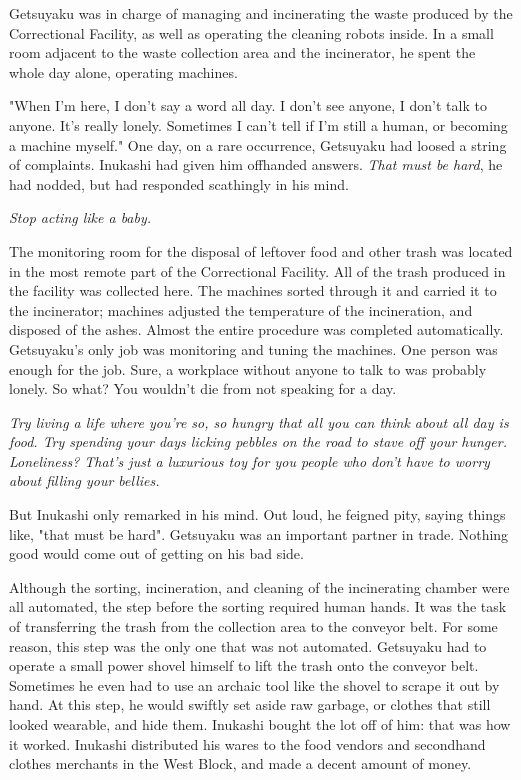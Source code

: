 Getsuyaku was in charge of managing and incinerating the waste produced
by the Correctional Facility, as well as operating the cleaning robots
inside. In a small room adjacent to the waste collection area and the
incinerator, he spent the whole day alone, operating machines.

"When I'm here, I don't say a word all day. I don't see anyone, I don't
talk to anyone. It's really lonely. Sometimes I can't tell if I'm still
a human, or becoming a machine myself." One day, on a rare occurrence,
Getsuyaku had loosed a string of complaints. Inukashi had given him
offhanded answers. \emph{That must be hard}, he had nodded, but had responded
scathingly in his mind.

\emph{Stop acting like a baby.}

The monitoring room for the disposal of leftover food and other trash
was located in the most remote part of the Correctional Facility. All of
the trash produced in the facility was collected here. The machines
sorted through it and carried it to the incinerator; machines adjusted
the temperature of the incineration, and disposed of the ashes. Almost
the entire procedure was completed automatically. Getsuyaku's only job
was monitoring and tuning the machines. One person was enough for the
job. Sure, a workplace without anyone to talk to was probably lonely. So
what? You wouldn't die from not speaking for a day.

\emph{Try living a life where you're so, so hungry that all you can think
	about all day is food. Try spending your days licking pebbles on the
	road to stave off your hunger. Loneliness? That's just a luxurious toy
	for you people who don't have to worry about filling your bellies.}

But Inukashi only remarked in his mind. Out loud, he feigned pity,
saying things like, "that must be hard". Getsuyaku was an important
partner in trade. Nothing good would come out of getting on his bad
side.

Although the sorting, incineration, and cleaning of the incinerating
chamber were all automated, the step before the sorting required human
hands. It was the task of transferring the trash from the collection
area to the conveyor belt. For some reason, this step was the only one
that was not automated. Getsuyaku had to operate a small power shovel
himself to lift the trash onto the conveyor belt. Sometimes he even had
to use an archaic tool like the shovel to scrape it out by hand. At this
step, he would swiftly set aside raw garbage, or clothes that still
looked wearable, and hide them. Inukashi bought the lot off of him: that
was how it worked. Inukashi distributed his wares to the food vendors
and secondhand clothes merchants in the West Block, and made a decent
amount of money.

